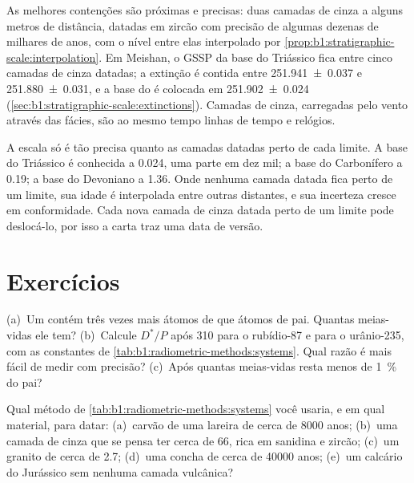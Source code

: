 As melhores contenções são próximas e precisas: duas camadas de cinza a alguns metros de
distância, datadas em zircão com precisão de algumas dezenas de milhares de anos, com o nível
entre elas interpolado por \cref{prop:b1:stratigraphic-scale:interpolation}. Em Meishan, o GSSP
da base do Triássico fica entre cinco camadas de cinza datadas; a extinção é contida entre
\qty[uncertainty-mode=separate]{251.941(37)}{\Ma} e \qty[uncertainty-mode=separate]{251.880(31)}{\Ma},
e a base do  é colocada em \qty[uncertainty-mode=separate]{251.902(24)}{\Ma}
(\cref{sec:b1:stratigraphic-scale:extinctions}). Camadas de cinza, carregadas pelo vento através
das fácies, são ao mesmo tempo linhas de tempo e relógios.

A escala só é tão precisa quanto as camadas datadas perto de cada limite. A base do Triássico é
conhecida a \qty{0.024}{\Myr}, uma parte em dez mil; a base do Carbonífero a \qty{0.19}{\Myr}; a
base do Devoniano a \qty{1.36}{\Myr}. Onde nenhuma camada datada fica perto de um limite, sua
idade é interpolada entre outras distantes, e sua incerteza cresce em conformidade. Cada nova
camada de cinza datada perto de um limite pode deslocá-lo, por isso a carta traz uma data de
versão.

\section{Exercícios}

\begin{exercise}[$\star$]\label{exo:b1:radiometric-methods:1}
(a)~Um  contém três vezes mais átomos de  que átomos de pai. Quantas
meias-vidas ele tem? (b)~Calcule $D^*/P$ após \qty{310}{\Myr} para o rubídio-87 e para o
urânio-235, com as constantes de \cref{tab:b1:radiometric-methods:systems}. Qual razão é mais
fácil de medir com precisão? (c)~Após quantas meias-vidas resta menos de \qty{1}{\percent} do
pai?
\end{exercise}

\begin{exercise}[$\star$]\label{exo:b1:radiometric-methods:2}
Qual método de \cref{tab:b1:radiometric-methods:systems} você usaria, e em qual material, para
datar: (a)~carvão de uma lareira de cerca de \num{8000} anos; (b)~uma camada de cinza que se
pensa ter cerca de \qty{66}{\Ma}, rica em sanidina e zircão; (c)~um granito de cerca de
\qty{2.7}{\Ga}; (d)~uma concha de cerca de \num{40000} anos; (e)~um calcário do Jurássico sem
nenhuma camada vulcânica?
\end{exercise}

